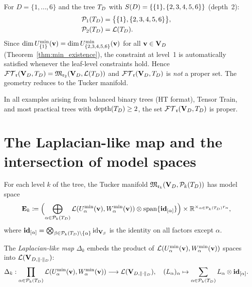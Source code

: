 \begin{example}
\label{ex:degenerate}
For $D = \{1,\ldots,6\}$ and the tree $T_D$ with
$S(D) = \{\{1\}, \{2,3,4,5,6\}\}$ (depth~2):
\begin{align*}
    \mathcal{P}_1(T_D) &= \bigl\{\{1\}, \{2,3,4,5,6\}\bigr\}, \\
    \mathcal{P}_2(T_D) &= \mathcal{L}(T_D).
\end{align*}
Since $\dim U^{\min}_{\{1\}}(\mathbf{v}) = \dim U^{\min}_{\{2,3,4,5,6\}}(\mathbf{v})$ for all
$\mathbf{v} \in \mathbf{V}_D$ (Theorem~\ref{thm:min_existence}), the constraint at level~1
is automatically satisfied whenever the leaf-level constraints hold.
Hence $\mathcal{FT}_{\mathfrak{r}}(\mathbf{V}_D,T_D) = \mathfrak{M}_{\mathfrak{r}_2}(\mathbf{V}_D, \mathcal{L}(T_D))$ and $\mathcal{FT}_{\mathfrak{r}}(\mathbf{V}_D,T_D)$ is \emph{not}
a proper set. The geometry reduces to the Tucker manifold.
\end{example}

In all examples arising from balanced binary trees (HT format),
Tensor Train, and most practical trees with $\mathrm{depth}(T_D) \geq 2$,
the set $\mathcal{FT}_{\mathfrak{r}}(\mathbf{V}_D,T_D)$ is proper.

\section{The Laplacian-like map and the intersection of model spaces}
\label{sec:TB_manifold:laplacian}

For each level $k$ of the tree, the Tucker manifold
$\mathfrak{M}_{\mathfrak{r}_k}(\mathbf{V}_D, \mathcal{P}_{k}(T_D))$ has model space
\begin{equation*}
    \mathbf{E}_{k} \coloneqq
    \Bigl(\bigoplus_{\alpha \in \mathcal{P}_{k}(T_D)}
    \mathcal{L}(U^{\min}_{\alpha}(\mathbf{v}), W^{\min}_{\alpha}(\mathbf{v}))
    \otimes \mathrm{span}\{\mathbf{id}_{[\alpha]}\}\Bigr)
    \times \mathbb{R}^{\times_{\alpha \in \mathcal{P}_{k}(T_D)} r_\alpha},
\end{equation*}
where $\mathbf{id}_{[\alpha]} = \bigotimes_{\beta \in \mathcal{P}_{k}(T_D)
\setminus \{\alpha\}} \mathrm{id}_{\mathbf{V}_\beta}$ is the identity on all factors
except $\alpha$.

The \emph{Laplacian-like map} $\Delta_k$ embeds the product of
$\mathcal{L}(U^{\min}_{\alpha}(\mathbf{v}), W^{\min}_{\alpha}(\mathbf{v}))$ spaces into $\mathcal{L}(\mathbf{V}_{D,\|\cdot\|_D})$:
\begin{equation}
\label{eq:laplacian}
    \Delta_k : \prod_{\alpha \in \mathcal{P}_{k}(T_D)}
    \mathcal{L}(U^{\min}_{\alpha}(\mathbf{v}), W^{\min}_{\alpha}(\mathbf{v}))
    \longrightarrow \mathcal{L}(\mathbf{V}_{D,\|\cdot\|_D}),
    \quad
    (L_\alpha)_\alpha \mapsto \sum_{\alpha \in \mathcal{P}_{k}(T_D)}
    L_\alpha \otimes \mathbf{id}_{[\alpha]}.
\end{equation}

